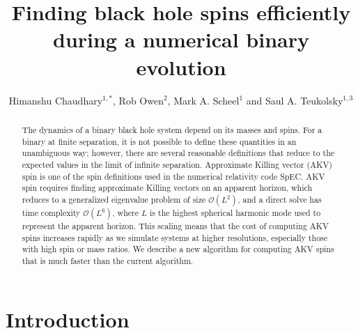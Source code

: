 \documentclass{iopjournal}
\begin{document}
\pagestyle{plain}

\title{Finding black hole spins efficiently during a numerical binary evolution}

\author{Himanshu Chaudhary$^{1,*}$, Rob Owen$^2$, Mark A. Scheel$^1$ and Saul A. Teukolsky$^{1,3}$}




\begin{abstract}

The dynamics of a binary black hole system depend on its masses and spins.
For a binary at finite separation, it is not possible to define these quantities in an unambiguous way; however, there are several reasonable definitions that reduce to the expected values in the limit of infinite separation.
Approximate Killing vector (AKV) spin is one of the spin definitions used in the numerical relativity code SpEC.
AKV spin requires finding approximate Killing vectors on an apparent horizon, which reduces to a generalized eigenvalue problem of size $\mathcal{O}(L^2)$, and a direct solve has time complexity $\mathcal{O}(L^6)$,
where $L$ is the highest spherical harmonic mode used to represent the apparent horizon.
This scaling means that the cost of computing AKV spins increases rapidly as we simulate systems at higher resolutions, especially those with high spin or mass ratios. We describe a new algorithm for computing AKV spins that is much faster than the current algorithm.

\end{abstract}


\section{\label{sec:Introduction} Introduction}
\end{document}
